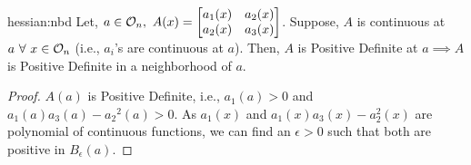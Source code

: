 \documentclass[../Analysis-3]{subfiles}
\begin{document}
\begin{Lem}{}{hessian:nbd}
    Let, $a \in \mathcal{O}_{n},\ A(x) = \begin{bmatrix}
            a_1(x) & a_2(x) \\
            a_2(x) & a_3(x)
        \end{bmatrix}$. Suppose, $A$ is continuous at $a \ \forall\ x \in \mathcal{O}_{n}$ (i.e., $a_i$'s are continuous at $a$). Then, $A$ is Positive Definite at $a \implies A$ is Positive Definite in a neighborhood of $a$.
\end{Lem}

\begin{proof}
    $ A(a) $ is Positive Definite, i.e., $ a_1(a) > 0 $ and $ a_1(a) a_3(a) - {a_2}^2(a) > 0 $. As $ a_1(x) $ and $ a_1(x)a_3(x) - a_2^2(x) $ are polynomial of continuous functions, we can find an $ \epsilon > 0 $ such that both are positive in $ B_{\epsilon}(a) $.
\end{proof}
\end{document}
